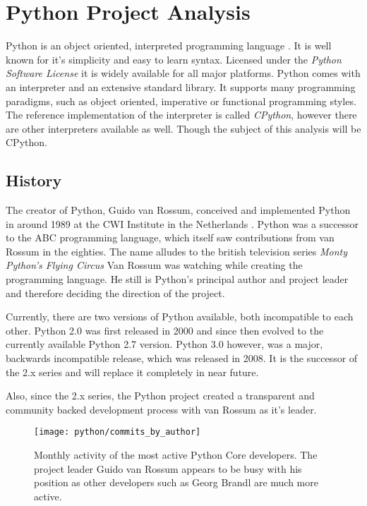 \section{Python Project Analysis} %


Python is an object oriented, interpreted programming language
\cite{PythonAbout}. It is well known for it's simplicity and easy to learn
syntax. Licensed under the \emph{Python Software License} \cite{PythonLicence}
it is widely available for all major platforms. Python comes with an
interpreter and an extensive standard library. It supports many programming
paradigms, such as object oriented, imperative or functional programming
styles. The reference implementation of the interpreter is called
\emph{CPython}, however there are other interpreters available as well. Though
the subject of this analysis will be CPython.

\subsection{History} %

The creator of Python, Guido van Rossum, conceived and implemented Python in
around 1989 at the CWI Institute in the Netherlands \cite{Venners2003}. Python
was a successor to the ABC programming language, which itself saw contributions
from van Rossum in the eighties. The name alludes to the british television
series \emph{Monty Python's Flying Circus} Van Rossum was watching while
creating the programming language. He still is Python's principal author and
project leader and therefore deciding the direction of the project.

Currently, there are two versions of Python available, both incompatible to
each other. Python 2.0 was first released in 2000 and since then evolved to the
currently available Python 2.7 version. Python 3.0 however, was a major,
backwards incompatible release, which was released in 2008. It is the successor
of the 2.x series and will replace it completely in near future.

Also, since the 2.x series, the Python project created a transparent and
community backed development process with van Rossum as it's leader.

\begin{figure}[htbp]
  \centering
  \texttt{[image: python/commits\_by\_author]}
  \caption{Monthly activity of the most active Python Core developers. The
  project leader Guido van Rossum appears to be busy with his position as other
  developers such as Georg Brandl are much more active.}
\end{figure}

